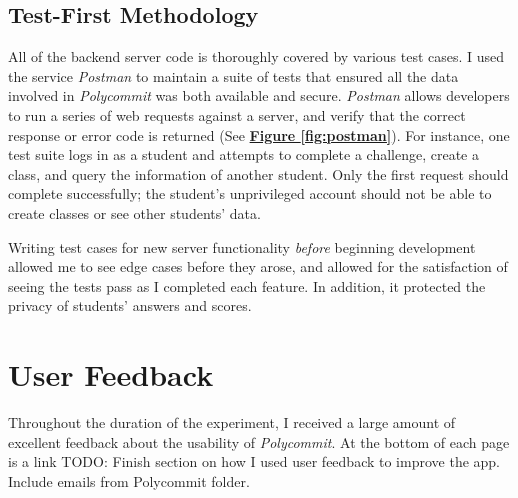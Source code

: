 \subsection{Test-First Methodology}
\par All of the backend server code is thoroughly covered by various test cases. I used the service \textit{Postman} to maintain a suite of tests that ensured all the data involved in \textit{Polycommit} was both available and secure. \textit{Postman} allows developers to run a series of web requests against a server, and verify that the correct response or error code is returned (See  \textbf{\hyperref[fig:polycommit5]{Figure \ref*{fig:postman}}}). For instance, one test suite logs in as a student and attempts to complete a challenge, create a class, and query the information of another student. Only the first request should complete successfully; the student's unprivileged account should not be able to create classes or see other students' data.

\par Writing test cases for new server functionality \textit{before} beginning development allowed me to see edge cases before they arose, and allowed for the satisfaction of seeing the tests pass as I completed each feature. In addition, it protected the privacy of students' answers and scores.



\section{User Feedback}
Throughout the duration of the experiment, I received a large amount of excellent feedback about the usability of \textit{Polycommit}. At the bottom of each page is a link 
TODO: Finish section on how I used user feedback to improve the app. Include emails from Polycommit folder.
